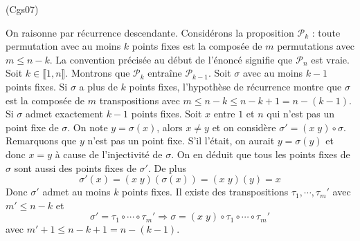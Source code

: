\begin{tiny}(Cgs07)\end{tiny} On raisonne par récurrence descendante. Considérons la proposition $\mathcal{P}_k$ : toute permutation avec au moins $k$ points fixes est la composée de $m$ permutations avec $m\leq n-k$.\newline
La convention précisée au début de l'énoncé signifie que $\mathcal{P}_n$ est vraie. Soit $k\in \llbracket 1,n \rrbracket$. Montrons que $\mathcal{P}_k$ entraîne $\mathcal{P}_{k-1}$.\newline
Soit $\sigma$ avec au moins $k-1$ points fixes.\newline
Si $\sigma$ a plus de $k$ points fixes, l'hypothèse de récurrence montre que $\sigma$ est la composée de $m$ transpositions avec $m\leq n-k \leq n-k+1 = n-(k-1)$.\newline
Si $\sigma$ admet exactement $k-1$ points fixes. Soit $x$ entre $1$ et $n$ qui n'est pas un point fixe de $\sigma$. On note $y=\sigma(x)$, alors $x\neq y$ et on considère $\sigma' = (x\;y)\circ \sigma$.\newline
Remarquons que $y$ n'est pas un point fixe. S'il l'était, on aurait $y=\sigma(y)$ et donc $x=y$ à cause de l'injectivité de $\sigma$. On en déduit que tous les points fixes de $\sigma$ sont aussi des points fixes de $\sigma'$. De plus 
\begin{displaymath}
 \sigma'(x)=(x\;y)(\sigma(x))=(x\;y)(y)=x
\end{displaymath}
Donc $\sigma'$ admet au moins $k$ points fixes. Il existe des transpositions $\tau_1,\cdots,\tau_m'$ avec $m'\leq n-k$ et 
\begin{displaymath}
 \sigma' = \tau_1\circ\cdots \circ \tau_m'
\Rightarrow \sigma = (x\;y) \circ \tau_1\circ\cdots \circ \tau_m'
\end{displaymath}
avec $m'+1\leq n-k +1 = n-(k-1)$.
